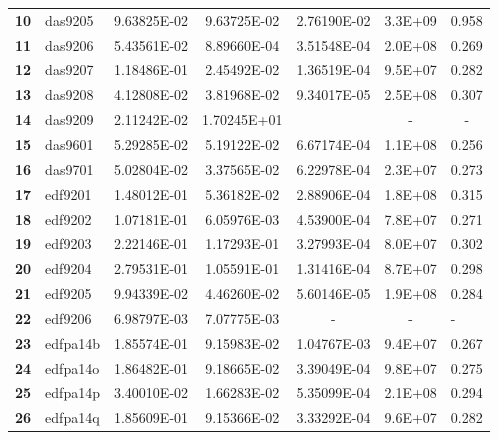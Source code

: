 \begin{longtable}{@{}llS[table-format=1.2e-2]S[table-format=1.2e-2]S[table-format=1.2e-2]S[table-format=1.2e-2]l@{}}
\textbf{10} & das9205  & 9.63825E-02 & 9.63725E-02 & 2.76190E-02 & 3.3E+09 & 0.958 \\
\textbf{11} & das9206  & 5.43561E-02 & 8.89660E-04 & 3.51548E-04 & 2.0E+08 & 0.269 \\
\textbf{12} & das9207  & 1.18486E-01 & 2.45492E-02 & 1.36519E-04 & 9.5E+07 & 0.282 \\
\textbf{13} & das9208  & 4.12808E-02 & 3.81968E-02 & 9.34017E-05 & 2.5E+08 & 0.307 \\
\textbf{14} &
  das9209 &
  2.11242E-02 &
  1.70245E+01 &
   &
   &
   \\
\textbf{15} & das9601  & 5.29285E-02 & 5.19122E-02 & 6.67174E-04 & 1.1E+08 & 0.256 \\
\textbf{16} & das9701  & 5.02804E-02 & 3.37565E-02 & 6.22978E-04 & 2.3E+07 & 0.273 \\
\textbf{17} & edf9201  & 1.48012E-01 & 5.36182E-02 & 2.88906E-04 & 1.8E+08 & 0.315 \\
\textbf{18} & edf9202  & 1.07181E-01 & 6.05976E-03 & 4.53900E-04 & 7.8E+07 & 0.271 \\
\textbf{19} & edf9203  & 2.22146E-01 & 1.17293E-01 & 3.27993E-04 & 8.0E+07 & 0.302 \\
\textbf{20} & edf9204  & 2.79531E-01 & 1.05591E-01 & 1.31416E-04 & 8.7E+07 & 0.298 \\
\textbf{21} & edf9205  & 9.94339E-02 & 4.46260E-02 & 5.60146E-05 & 1.9E+08 & 0.284 \\
\textbf{22} & edf9206  & 6.98797E-03 & 7.07775E-03 & -                                   & -       & -     \\
\textbf{23} & edfpa14b & 1.85574E-01 & 9.15983E-02 & 1.04767E-03 & 9.4E+07 & 0.267 \\
\textbf{24} & edfpa14o & 1.86482E-01 & 9.18665E-02 & 3.39049E-04 & 9.8E+07 & 0.275 \\
\textbf{25} & edfpa14p & 3.40010E-02 & 1.66283E-02 & 5.35099E-04 & 2.1E+08 & 0.294 \\
\textbf{26} & edfpa14q & 1.85609E-01 & 9.15366E-02 & 3.33292E-04 & 9.6E+07 & 0.282 \\

\end{longtable}
